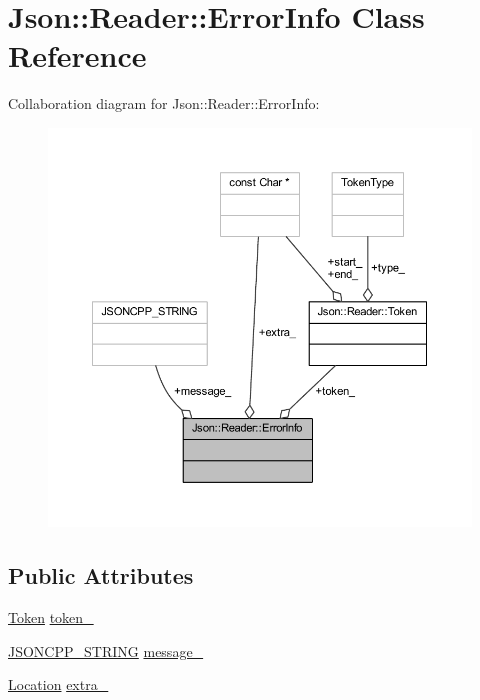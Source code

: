 \hypertarget{class_json_1_1_reader_1_1_error_info}{}\section{Json\+:\+:Reader\+:\+:Error\+Info Class Reference}
\label{class_json_1_1_reader_1_1_error_info}


Collaboration diagram for Json\+:\+:Reader\+:\+:Error\+Info\+:\nopagebreak
\begin{figure}[H]
\begin{center}
\leavevmode
\includegraphics[width=350pt]{class_json_1_1_reader_1_1_error_info__coll__graph}
\end{center}
\end{figure}
\subsection*{Public Attributes}
\begin{DoxyCompactItemize}
\item 
\hyperlink{class_json_1_1_reader_1_1_token}{Token} \hyperlink{class_json_1_1_reader_1_1_error_info_a52e1c71b12eb1c3f0395d7ef1e778ce6}{token\+\_\+}
\item 
\hyperlink{json_8h_a1e723f95759de062585bc4a8fd3fa4be}{J\+S\+O\+N\+C\+P\+P\+\_\+\+S\+T\+R\+I\+NG} \hyperlink{class_json_1_1_reader_1_1_error_info_a3529d420f7c83165565bf294a5d6ed13}{message\+\_\+}
\item 
\hyperlink{class_json_1_1_reader_a46795b5b272bf79a7730e406cb96375a}{Location} \hyperlink{class_json_1_1_reader_1_1_error_info_af92c24acf642b040d6e40aac4952d44d}{extra\+\_\+}
\end{DoxyCompactItemize}


